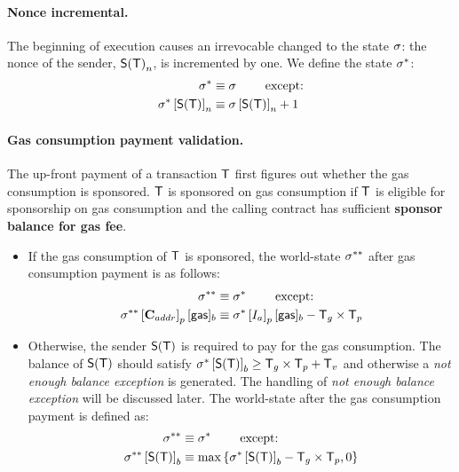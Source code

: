 \paragraph{Nonce incremental.}
The beginning of execution 
causes an irrevocable changed to the state $\mathbf{\sigma}$: 
the nonce of the sender, $\mathsf{S}{\left({\textsf{T}} \right)}_n$, is incremented by one. 
%
We define the state $\mathbf{\sigma}^*$:
\begin{align}
	\mathbf{\sigma}^*  &\equiv \mathbf{\sigma} \qquad \mbox{  except:}\\
	\mathbf{\sigma}^*\left[\mathsf{S}{\left({\textsf{T}} \right)} \right]_n &\equiv \mathbf{\sigma}\left[\mathsf{S}{\left({\textsf{T}} \right)} \right]_n+1 
\end{align}

\paragraph{Gas consumption payment validation.}

The up-front payment of a transaction $\textsf{T}$ first figures out whether the gas consumption is sponsored. $\textsf{T}$ is sponsored on gas consumption if $\textsf{T}$ is eligible for sponsorship on gas consumption and the calling contract has sufficient \textbf{sponsor balance for gas fee}. 
\begin{itemize}
	\item If the gas consumption of $\textsf{T}$ is sponsored, the world-state $\mathbf{\sigma}^{**}$ after gas consumption payment is as follows: 
	\begin{align}
		\mathbf{\sigma}^{**}  &\equiv \mathbf{\sigma}^* \qquad \mbox{  except:}\\
		\mathbf{\sigma}^{**}\left[\mathbf{C}_{addr}\right]_p[{\sf gas}]_b &\equiv \mathbf{\sigma}^*\left[I_a\right]_p[{\sf gas}]_b-\textsf{T}_g\times\textsf{T}_p
	\end{align} 
	
	\item Otherwise, the sender $\mathsf{S}{\left({\textsf{T}} \right)}$ is required to pay for the gas consumption. 
	The balance of $\mathsf{S}{\left({\textsf{T}} \right)}$ should satisfy $\mathbf{\sigma}^{*} \left[\mathsf{S}{\left({\textsf{T}} \right)}\right]_b \ge \textsf{T}_g\times\textsf{T}_p+\textsf{T}_v$ and otherwise a \emph{not enough balance exception} is generated. The handling of \emph{not enough balance exception} will be discussed later.
	The world-state after the gas consumption payment is defined as: 
	\begin{align}
		\mathbf{\sigma}^{**}  &\equiv \mathbf{\sigma}^* \qquad \mbox{  except:}\\
		\mathbf{\sigma}^{**} \left[\mathsf{S}{\left({\textsf{T}} \right)}\right]_b &\equiv \max{\left \{{\ensuremath{\mathbf{\sigma}}^*\left[\ensuremath{\mathsf{S}{\left({\textsf{T}} \right)}}\right]_b-\textsf{T}_g\times\textsf{T}_p,0} \right \}}
	\end{align}
\end{itemize}

